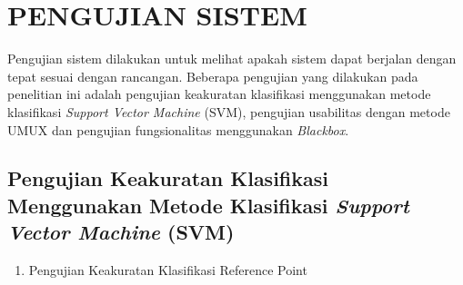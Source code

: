 \begin{enumerate}[a.]
\begin{enumerate}[a.]
\end{enumerate}

\section{\uppercase{PENGUJIAN SISTEM}}
\par Pengujian sistem dilakukan untuk melihat apakah sistem dapat berjalan dengan tepat sesuai dengan rancangan. Beberapa pengujian yang dilakukan pada penelitian ini adalah pengujian keakuratan klasifikasi menggunakan metode klasifikasi \textit{Support Vector Machine} (SVM), pengujian usabilitas dengan metode UMUX dan pengujian fungsionalitas menggunakan \textit{Blackbox}.

\subsection{Pengujian Keakuratan Klasifikasi Menggunakan Metode Klasifikasi \textit{Support Vector Machine} (SVM)}
\begin{enumerate}

	\item Pengujian Keakuratan Klasifikasi Reference Point


\end{enumerate}
\end{enumerate}
